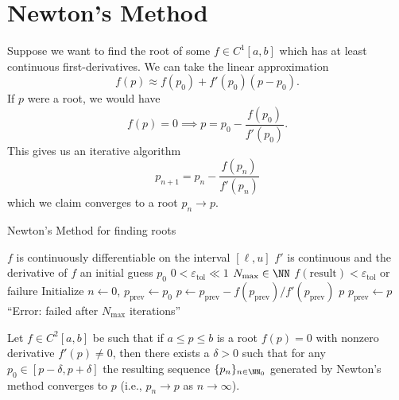\section{Newton's Method}

Suppose we want to find the root of some $f\in C^{1}[a,b]$ which has at
least continuous first-derivatives. We can take the linear approximation
\begin{equation}
  f(p) \approx f(p_{0}) + f'(p_{0})(p - p_{0}).
\end{equation}
If $p$ were a root, we would have
\begin{equation}
  f(p) = 0\implies p = p_{0} - \frac{f(p_{0})}{f'(p_{0})}.
\end{equation}
This gives us an iterative algorithm
\begin{equation}
p_{n+1} = p_{n} - \frac{f(p_{n})}{f'(p_{n})}
\end{equation}
which we claim converges to a root $p_{n}\to p$.

\begin{algorithm}\label{alg:root:newton-method}
  \caption{Newton's Method for finding roots}
  \begin{algorithmic}[1]
    \Require $f$ is continuously differentiable on the interval $[\ell,u]$
    \Require $f'$ is continuous and the derivative of $f$
    \Require an initial guess $p_{0}$
    \Require $0<\varepsilon_{\text{tol}}\ll 1$
    \Require $N_{\text{max}}\in\NN$
    \Ensure $f(\mbox{result}) < \varepsilon_{\text{tol}}$ or failure
    \State Initialize $n\gets 0$, $p_{\text{prev}}\gets p_{0}$
      \State $p\gets p_{\text{prev}} - f(p_{\text{prev}})/f'(p_{\text{prev}})$
      \State\Return $p$
      \EndIf
      \State $p_{\text{prev}}\gets p$
    \EndFor
    \State\Fail ``Error: failed after $N_{\text{max}}$ iterations''
  \EndFunction
\end{algorithmic}
\end{algorithm}

\begin{thm}[Convergence]
Let $f\in C^{2}[a,b]$ be such that if $a\leq p\leq b$ is a root $f(p)=0$
with nonzero derivative $f'(p)\neq0$,
then there exists a $\delta>0$ such that for any $p_{0}\in[p-\delta,p+\delta]$
the resulting sequence $\{p_{n}\}_{n\in\NN_{0}}$ generated by Newton's
method converges to $p$ (i.e., $p_{n}\to p$ as $n\to\infty$).
\end{thm}

